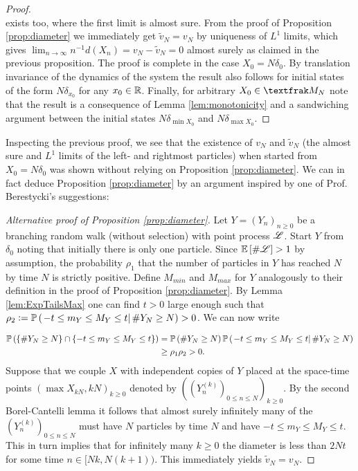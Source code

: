 \begin{proof}
\begin{equation}
\end{equation}
exists too, where the first limit is almost sure. From the proof of Proposition \ref{prop:diameter} we immediately get $\tilde{v}_N = v_N$ by uniqueness of $L^1$ limits, which gives $\lim_{n\to\infty} n^{-1}d(X_n) = v_N - \tilde{v}_N = 0$ almost surely as claimed in the previous proposition. The proof is complete in the case $X_0 = N \delta_0$. By translation invariance of the dynamics of the system the result also follows for initial states of the form $N \delta_{x_0}$ for any $x_0 \in \mathbb{R}$. Finally, for arbitrary $X_0 \in \frak{M}_N$ note that the result is a consequence of Lemma \ref{lem:monotonicity} and a sandwiching argument between the initial states $N \delta_{\min X_0}$ and $N \delta_{\max X_0}$. 
\end{proof}


Inspecting the previous proof, we see that the existence of $v_N$ and $\tilde{v}_N$ (the almost sure and $L^1$ limits of the left- and rightmost particles) when started from $X_0 = N \delta_0$ was shown without relying on Proposition \ref{prop:diameter}. We can in fact deduce Proposition \ref{prop:diameter} by an argument inspired by one of Prof. Berestycki's suggestions:

\begin{proof}[Alternative proof of Proposition \ref{prop:diameter}]
Let $Y = (Y_n)_{n \geq 0}$ be a branching random walk (without selection) with point process $\mathscr{L}$. Start $Y$ from $\delta_{0}$ noting that initially there is only one particle. Since $\mathbb{E}\left[ \# \mathscr{L} \right] > 1$ by assumption, the probability $\rho_1$ that the number of particles in $Y$ has reached $N$ by time $N$ is strictly positive. Define $M_{min}$ and $M_{max}$ for $Y$ analogously to their definition in the proof of Proposition \ref{prop:diameter}. By Lemma \ref{lem:ExpTailsMax} one can find $t > 0$ large enough such that $\rho_2 \vcentcolon= \mathbb{P} \left( \left. -t \leq m_Y \leq M_Y \leq t  \right| \# Y_N \geq N \right) > 0$. We can now write

\begin{align*}
\mathbb{P} \left( \{ \# Y_N \geq N \} \cap \{-t \leq m_Y \leq M_Y \leq t \} \right) &= \mathbb{P} \left( \# Y_N \geq N \right) \mathbb{P} \left( \left. -t \leq m_Y \leq M_Y \leq t  \right| \# Y_N \geq N \right) \\
															   &\geq \rho_1 \rho_2 > 0. 
\end{align*}
Suppose that we couple $X$ with independent copies of $Y$  placed at the space-time points $(\max X_{kN}, kN)_{k \geq 0}$ denoted by $((Y^{(k)}_n)_{0 \leq n \leq N})_{k \geq 0}$. By the second Borel-Cantelli lemma it follows that almost surely infinitely many of the $(Y^{(k)}_n)_{0 \leq n \leq N}$ must have $N$ particles by time $N$ and have $-t \leq m_Y \leq M_Y \leq t $. This in turn implies that for infinitely many $k \geq 0$ the diameter is less than $2Nt$ for some time $n \in [Nk, N(k+1))$. This immediately yields $\tilde{v}_N = v_N$. 
\end{proof}

